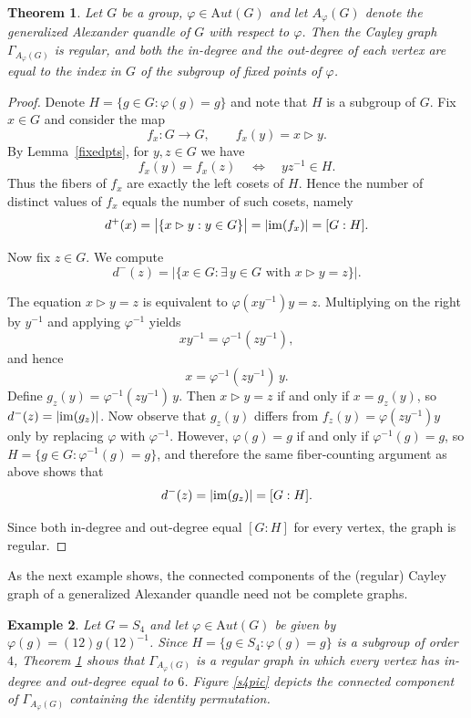 \documentclass[english,11pt]{amsart}
\newtheorem{Theorem}{Theorem}[section]
\newtheorem{Example}[Theorem]{Example}
\newcommand{\Aut}{{\mathrm Aut}}
\newcommand{\im}{{\rm im}}
\begin{document}
\begin{Theorem}
\label{regular}
    Let $G$ be a group, $\varphi \in \Aut(G)$ and let $A_\varphi(G)$ denote the generalized Alexander quandle of $G$ with respect to $\varphi$. Then the Cayley graph $\Gamma_{A_\varphi(G)}$ is regular, and both the in-degree and the out-degree of each vertex are equal to the index in $G$ of the subgroup of fixed  points of $\varphi$.
\end{Theorem}
\begin{proof}
Denote $H=\{g\in G : \varphi(g)=g\}$ and note that $H$ is a subgroup of $G$.
Fix $x \in G$ and consider the map
\[
f_x : G \to G, \qquad f_x(y)=x \rhd y.
\]
By Lemma~\ref{fixedpts}, for $y,z\in G$ we have
\[
f_x(y)=f_x(z)
\quad\Longleftrightarrow\quad
yz^{-1}\in H.
\]
Thus the fibers of $f_x$ are exactly the left cosets of $H$. Hence the number of distinct values of $f_x$ equals the number of such cosets, namely
\[
d^+(x)=\bigl|\{x \rhd y : y\in G\}\bigr|=|\im(f_x)|=[G:H].
\]

Now fix $z \in G$. We compute
\[
d^-(z)
=
\bigl|\{x\in G : \exists\, y\in G \text{ with } x\rhd y=z\}\bigr|.
\]

The equation $x\rhd y=z$ is equivalent to $\varphi(xy^{-1})y=z$.
Multiplying on the right by $y^{-1}$ and applying $\varphi^{-1}$ yields
\[
xy^{-1}=\varphi^{-1}(zy^{-1}),
\]
and hence
\[
x=\varphi^{-1}(zy^{-1})\,y.
\]
Define $g_z(y)=\varphi^{-1}(zy^{-1})\,y$.
Then $x\rhd y=z$ if and only if $x=g_z(y)$, so $d^-(z)=|\im(g_z)|$.
Now observe that $g_z(y)$ differs from $f_{z}(y)=\varphi(zy^{-1})y$ only by replacing $\varphi$ with $\varphi^{-1}$. However, $\varphi(g)=g$ if and only if $\varphi^{-1}(g)=g$, so 
$H=\{g\in G : \varphi^{-1}(g)=g\}$, and therefore
the same fiber-counting argument as above shows that
\[
d^-(z)=|\im(g_z)|=[G:H].
\]

Since both in-degree and out-degree equal $[G:H]$ for every vertex, the graph is regular.
\end{proof}

As the next example shows, the connected components of the (regular) Cayley graph of a generalized Alexander quandle need not be complete graphs.

\begin{Example}
    Let $G=S_4$ and let $\varphi \in \Aut(G)$ be given by $\varphi(g)=(12)g(12)^{-1}$. Since $H=\{g \in S_4 : \varphi(g)=g\}$ is a subgroup of order $4$, Theorem \ref{regular} shows that $\Gamma_{A_\varphi(G)}$ is a regular graph in which every vertex has in-degree and out-degree equal to $6$. Figure \ref{s4pic} depicts the connected component of $\Gamma_{A_\varphi(G)}$ containing the identity permutation. 
\end{Example}
\end{document}

